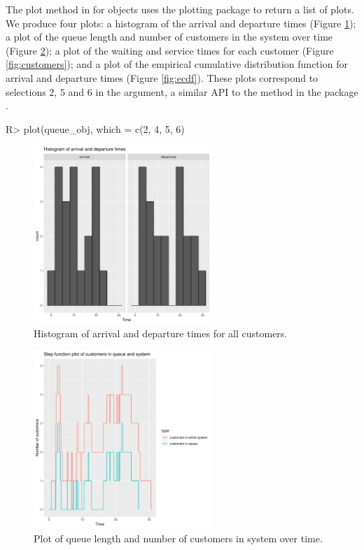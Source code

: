 \documentclass[article]{jss}
\begin{document}
The plot method in  for  objects uses the plotting package  \citep{Rpkg_ggplot2} to return a list of plots. We produce four plots: a histogram of the arrival and departure times (Figure \ref{fig:histogram}); a plot of the queue length and number of customers in the system over time (Figure \ref{fig:qlength}); a plot of the waiting and service times for each customer (Figure \ref{fig:customers}); and a plot of the empirical cumulative distribution function for arrival and departure times (Figure \ref{fig:ecdf}). These plots correspond to selections $2$, $5$ and $6$ in the  argument, a similar API to the  method in the  package \citep{Rproglang}.

\begin{CodeChunk}
\begin{Sinput}
R> plot(queue_obj, which = c(2, 4, 5, 6)
\end{Sinput}
\end{CodeChunk}

\begin{figure}[!htb]
\centering
\includegraphics[width = 0.6\textwidth]{figures/hist_083.pdf}
\caption{Histogram of arrival and departure times for all customers.}
\label{fig:histogram}
\end{figure}

\begin{figure}[!htb]
\centering
\includegraphics[width = 0.6\textwidth]{figures/qlength_083.pdf}
\caption{Plot of queue length and number of customers in system over time.}
\label{fig:qlength}
\end{figure}
\end{document}
